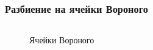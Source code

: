 \documentclass[pdf,hyperref={unicode}]{beamer}
\begin{document}
\begin{frame}%
\transdissolve[duration=0.2]
\frametitle{Разбиение на ячейки Вороного}

\begin{columns}


\begin{column}{0.3\linewidth}
\begin{figure}[h]
\caption{\tiny Ячейки Вороного}
\end{figure}
\end{column}




\end{columns}
\end{frame}
\end{document}
